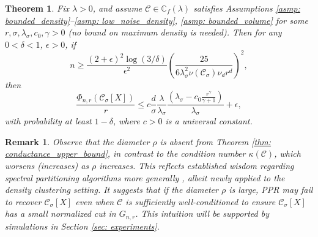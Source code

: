 \documentclass{article}
\newcommand{\1}{\mathbf{1}}
\newcommand{\Xbf}{X}             %
\newcommand{\Cbb}{\mathbb{C}}
\newcommand{\Cset}{\mathcal{C}}
\newcommand{\Csig}{\Cset_{\sigma}}
\theoremstyle{aldenthm}
\newtheorem{theorem}{Theorem}
\theoremstyle{aldenrmrk}
\newtheorem{remark}{Remark}
\begin{document}
\begin{theorem}
  \label{thm: conductance_upper_bound}
  Fix $\lambda > 0$, and assume $\Cset \in \Cbb_f(\lambda)$ satisfies
  Assumptions \ref{asmp: bounded_density}--\ref{asmp: low_noise_density}, 
  \ref{asmp: bounded_volume} for some $r, \sigma, \lambda_{\sigma}, c_0, \gamma
  > 0$ (no bound on maximum density is needed). Then for any $0 < \delta < 1$,
  $\epsilon > 0$, if 
  \begin{equation}
    \label{eqn: conductance_sample_complexity}
    n \geq \frac{(2+\epsilon)^2\log(3/\delta)}{\epsilon^2}\left(\frac{25}
      {6 \lambda_{\sigma}^2\nu(\Csig) \nu_d r^d}\right)^2,
  \end{equation}
  then
  \begin{equation}
    \label{eqn: conductance_additive_error_bound}
    \frac{\Phi_{n,r}(\Csig[\Xbf])}{r} \leq c \frac{d}{\sigma}
    \frac{\lambda}{\lambda_{\sigma}} \frac{(\lambda_{\sigma} -
      c_0\frac{r^{\gamma}}{\gamma+1})}{\lambda_{\sigma}} + \epsilon, 
  \end{equation}
  with probability at least $1-\delta$, where $c > 0$ is a universal constant. 
\end{theorem}

\begin{remark}
  \label{rmk: diameter}
  Observe that the diameter $\rho$ is absent from Theorem \ref{thm:
    conductance_upper_bound}, in contrast to the condition number
  $\kappa(\Cset)$, which worsens (increases) as $\rho$ increases. This
  reflects established wisdom regarding spectral partitioning
  algorithms more generally \citep{guattery1995, hein2010}, albeit newly applied
  to the density clustering setting. It suggests that if the diameter $\rho$ is
  large, PPR may fail to recover $\Csig[\Xbf]$ even when $\Cset$ is
  sufficiently well-conditioned to ensure $\Csig[\Xbf]$ has a small normalized
  cut in $G_{n,r}$. This intuition will be supported by simulations in Section
  \ref{sec: experiments}. 
\end{remark}
\end{document}
